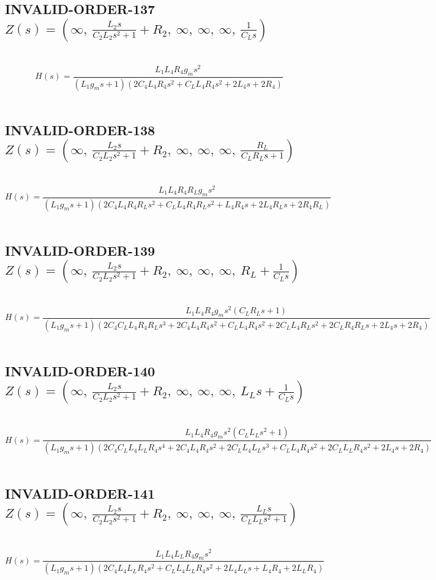 \documentclass{article}
\begin{document}
\subsection{INVALID-ORDER-137 $Z(s) = \left( \infty, \  \frac{L_{2} s}{C_{2} L_{2} s^{2} + 1} + R_{2}, \  \infty, \  \infty, \  \infty, \  \frac{1}{C_{L} s}\right)$ } \ 
\textbf{\[H(s) = \frac{L_{1} L_{4} R_{4} g_{m} s^{2}}{\left(L_{1} g_{m} s + 1\right) \left(2 C_{4} L_{4} R_{4} s^{2} + C_{L} L_{4} R_{4} s^{2} + 2 L_{4} s + 2 R_{4}\right)}\] } \ 
\subsection{INVALID-ORDER-138 $Z(s) = \left( \infty, \  \frac{L_{2} s}{C_{2} L_{2} s^{2} + 1} + R_{2}, \  \infty, \  \infty, \  \infty, \  \frac{R_{L}}{C_{L} R_{L} s + 1}\right)$ } \ 
\textbf{\[H(s) = \frac{L_{1} L_{4} R_{4} R_{L} g_{m} s^{2}}{\left(L_{1} g_{m} s + 1\right) \left(2 C_{4} L_{4} R_{4} R_{L} s^{2} + C_{L} L_{4} R_{4} R_{L} s^{2} + L_{4} R_{4} s + 2 L_{4} R_{L} s + 2 R_{4} R_{L}\right)}\] } \ 
\subsection{INVALID-ORDER-139 $Z(s) = \left( \infty, \  \frac{L_{2} s}{C_{2} L_{2} s^{2} + 1} + R_{2}, \  \infty, \  \infty, \  \infty, \  R_{L} + \frac{1}{C_{L} s}\right)$ } \ 
\textbf{\[H(s) = \frac{L_{1} L_{4} R_{4} g_{m} s^{2} \left(C_{L} R_{L} s + 1\right)}{\left(L_{1} g_{m} s + 1\right) \left(2 C_{4} C_{L} L_{4} R_{4} R_{L} s^{3} + 2 C_{4} L_{4} R_{4} s^{2} + C_{L} L_{4} R_{4} s^{2} + 2 C_{L} L_{4} R_{L} s^{2} + 2 C_{L} R_{4} R_{L} s + 2 L_{4} s + 2 R_{4}\right)}\] } \ 
\subsection{INVALID-ORDER-140 $Z(s) = \left( \infty, \  \frac{L_{2} s}{C_{2} L_{2} s^{2} + 1} + R_{2}, \  \infty, \  \infty, \  \infty, \  L_{L} s + \frac{1}{C_{L} s}\right)$ } \ 
\textbf{\[H(s) = \frac{L_{1} L_{4} R_{4} g_{m} s^{2} \left(C_{L} L_{L} s^{2} + 1\right)}{\left(L_{1} g_{m} s + 1\right) \left(2 C_{4} C_{L} L_{4} L_{L} R_{4} s^{4} + 2 C_{4} L_{4} R_{4} s^{2} + 2 C_{L} L_{4} L_{L} s^{3} + C_{L} L_{4} R_{4} s^{2} + 2 C_{L} L_{L} R_{4} s^{2} + 2 L_{4} s + 2 R_{4}\right)}\] } \ 
\subsection{INVALID-ORDER-141 $Z(s) = \left( \infty, \  \frac{L_{2} s}{C_{2} L_{2} s^{2} + 1} + R_{2}, \  \infty, \  \infty, \  \infty, \  \frac{L_{L} s}{C_{L} L_{L} s^{2} + 1}\right)$ } \ 
\textbf{\[H(s) = \frac{L_{1} L_{4} L_{L} R_{4} g_{m} s^{2}}{\left(L_{1} g_{m} s + 1\right) \left(2 C_{4} L_{4} L_{L} R_{4} s^{2} + C_{L} L_{4} L_{L} R_{4} s^{2} + 2 L_{4} L_{L} s + L_{4} R_{4} + 2 L_{L} R_{4}\right)}\] } \ 
\end{document}
